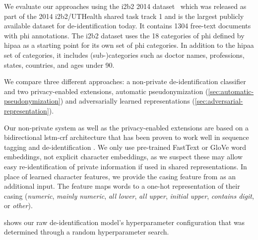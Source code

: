 We evaluate our approaches using the i2b2 2014
dataset~\citep{stubbs2015annotating} which was released as part of
the 2014 i2b2/UTHealth shared task track 1 and is the largest publicly
available dataset for de-identification today.
%
It contains 1304 free-text documents with \ac{phi} annotations.
%
The i2b2 dataset uses the 18 categories of \ac{phi} defined by \ac{hipaa} as a starting point for its own set of \ac{phi} categories.
%
In addition to the \ac{hipaa} set of categories, it includes (sub-)categories such as doctor names, professions, states, countries, and ages under 90.

%
We compare three different approaches: a non-private de-identification classifier and two privacy-enabled extensions, automatic pseudonymization (\cref{sec:automatic-pseudonymization}) and adversarially learned representations (\cref{sec:adversarial-representation}).

%
Our non-private system as well as the privacy-enabled extensions are based on a bidirectional \ac{lstm}-\ac{crf} architecture that has been proven to work well in sequence tagging \citep{huang2015bidirectional,lample2016neural} and de-identification \citep{dernoncourt2017identification,liu2017identification}.
%
We only use pre-trained FastText \citep{bojanowski2017enriching} or GloVe \citep{pennington2014glove} word embeddings, not explicit character embeddings, as we suspect these may allow easy re-identification of private information if used in shared representations.
%
In place of learned character features, we provide the casing feature from \citet{reimers2017optimal} as an additional input.
%
The feature maps words to a one-hot representation of their casing (\textit{numeric}, \textit{mainly numeric}, \textit{all lower}, \textit{all upper}, \textit{initial upper}, \textit{contains digit}, or \textit{other}).

%
 shows our raw de-identification model's hyperparameter configuration that was determined through a random hyperparameter search.

